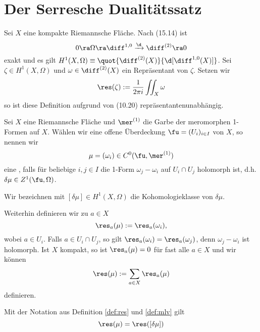 
\section{Der Serresche Dualitätssatz}
\label{sec:serre}

\begin{defin}
  \label{def:res}
  Sei $X$ eine kompakte Riemannsche Fläche. Nach (15.14) ist
  \[
  0 \ra \Omega \ra \diff^{1,0} \xrightarrow{\d} \diff^{(2)} \ra 0
  \]
  exakt und es gilt $H^1(X, \Omega) \equiv
  \quot{\diff^{(2)}(X)}{\d[\diff^{1,0}(X)]}$. Sei $\zeta \in H^1(X,
  \Omega)$ und $\omega \in \diff^{(2)}(X)$ ein Repräsentant von
  $\zeta$. Setzen wir
  \[
  \res(\zeta) := \frac{1}{2\pi i} \iint_X \omega
  \]
  so ist diese Definition aufgrund von (10.20) repräsentantenunabhängig.
\end{defin}

\begin{defin}
  \label{def:mlv}
  Sei $X$ eine Riemannsche Fläche und $\mer^{(1)}$ die Garbe der
  meromorphen 1-Formen auf $X$. Wählen wir eine offene Überdeckung
  $\fu = (U_i)_{i \in I}$ von $X$, so nennen wir
  \[
  \mu = (\omega_i) \in C^0( \fu, \mer^{(1)})
  \]
  eine , falls für beliebige $i,j \in
  I$ die 1-Form $\omega_j - \omega_i$ auf $U_i \cap U_j$ holomorph
  ist, d.h. $ \delta \mu \in Z^1(\fu, \Omega)$.

  Wir bezeichnen mit $[\delta \mu] \in H^1(X, \Omega)$ die
  Kohomologieklasse von $\delta \mu$.

  Weiterhin definieren wir zu $a \in X$
  \[
  \res_a(\mu) := \res_a(\omega_i),
  \]
  wobei $a \in U_i$. Falls $a \in U_i \cap U_j$, so gilt
  $\res_a(\omega_i) = \res_a(\omega_j)$, denn $\omega_j - \omega_i$
  ist holomorph. Ist $X$ kompakt, so ist $\res_a(\mu) = 0$ für fast
  alle $a \in X$ und wir können
  \[
  \res(\mu) := \sum_{a \in X} \res_a(\mu)
  \]
  definieren.
\end{defin}

\begin{thm}
  Mit der Notation aus Definition \ref{def:res} und \ref{def:mlv} gilt
  \[
  \res(\mu) = \res([\delta \mu])
  \]
\end{thm}

